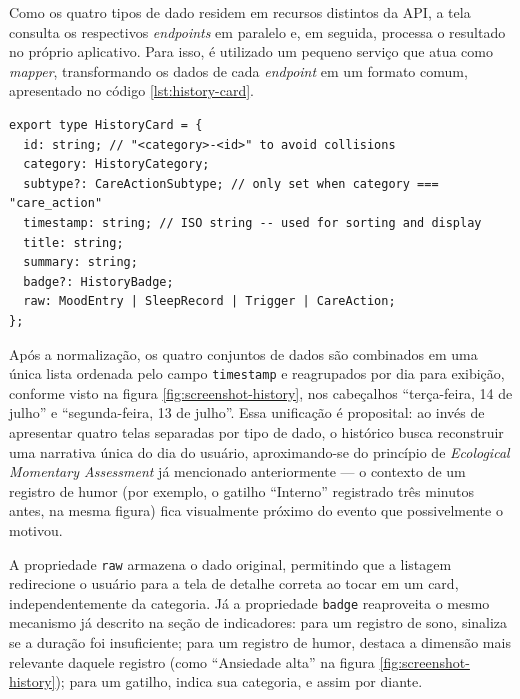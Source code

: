 Como os quatro tipos de dado residem em recursos distintos da API, a
tela consulta os respectivos \textit{endpoints} em paralelo e, em
seguida, processa o resultado no próprio aplicativo. Para isso, é
utilizado um pequeno serviço que atua como \textit{mapper}, transformando
os dados de cada \textit{endpoint} em um formato comum, apresentado no
código \ref{lst:history-card}.

\newpage

\begin{lstlisting}[caption={Formato comum da tela de histórico}, label={lst:history-card}]
export type HistoryCard = {
  id: string; // "<category>-<id>" to avoid collisions
  category: HistoryCategory;
  subtype?: CareActionSubtype; // only set when category === "care_action"
  timestamp: string; // ISO string -- used for sorting and display
  title: string;
  summary: string;
  badge?: HistoryBadge;
  raw: MoodEntry | SleepRecord | Trigger | CareAction;
};
\end{lstlisting}

Após a normalização, os quatro conjuntos de dados são combinados em uma
única lista ordenada pelo campo \texttt{timestamp} e reagrupados por dia
para exibição, conforme visto na figura \ref{fig:screenshot-history}, nos
cabeçalhos ``terça-feira, 14 de julho'' e ``segunda-feira, 13 de julho''.
Essa unificação é proposital: ao invés de apresentar quatro telas
separadas por tipo de dado, o histórico busca reconstruir uma narrativa
única do dia do usuário, aproximando-se do princípio de \textit{Ecological
Momentary Assessment} já mencionado anteriormente — o contexto de um
registro de humor (por exemplo, o gatilho ``Interno'' registrado três
minutos antes, na mesma figura) fica visualmente próximo do evento que
possivelmente o motivou.

A propriedade \texttt{raw} armazena o dado original, permitindo que a
listagem redirecione o usuário para a tela de detalhe correta ao tocar em
um card, independentemente da categoria. Já a propriedade \texttt{badge}
reaproveita o mesmo mecanismo já descrito na seção de indicadores: para
um registro de sono, sinaliza se a duração foi insuficiente; para um
registro de humor, destaca a dimensão mais relevante daquele registro
(como ``Ansiedade alta'' na figura \ref{fig:screenshot-history}); para um
gatilho, indica sua categoria, e assim por diante.

\FloatBarrier
